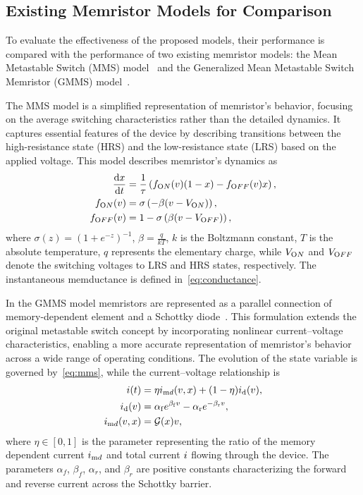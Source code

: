 \documentclass{ieeeaccess}
\begin{document}
\subsection{Existing Memristor Models for Comparison}

To evaluate the effectiveness of the proposed models, their performance is compared with the performance of two existing memristor models: the Mean Metastable Switch (MMS) model~\cite{Minati2020} and the  Generalized Mean Metastable Switch Memristor (GMMS) model~\cite{Molter2016, Ostrovskii2021}.

The MMS model is a simplified representation of memristor's behavior, focusing on the average switching characteristics rather than the detailed dynamics. It captures essential features of the device by describing transitions between the high-resistance state (HRS) and the low-resistance state (LRS) based on the applied voltage. This model describes memristor's dynamics as
\begin{align}
  \label{eq:mms}
  \frac{{\mathrm d} {x}}{{\mathrm d} t}       & = \frac{1}{\tau} \left( f_{\text ON} (v) (1-x) - f_{\text OFF} (v) x \right),              \\
  f_{\text ON} (v)  & = \sigma\left(-\beta (v-V_{\text ON})\right) \label{eq:mms5b},      \\
  f_{\text OFF} (v) & = 1 - \sigma\left(\beta (v-V_{\text OFF})\right)  \label{eq:mms5c}, 
\end{align}
where \(\sigma(z) = (1+e^{-z})^{-1}\), \(\beta= \frac{q}{kT}\), \(k\) is the Boltzmann constant, \(T\) is the absolute temperature, \(q\) represents the elementary charge, while \(V_{\text ON}\) and \(V_{\text OFF}\) denote the switching voltages to LRS and HRS states, respectively. The instantaneous memductance is defined in~\eqref{eq:conductance}.


In the GMMS model memristors are represented as a parallel connection of memory-dependent element and a Schottky diode~\cite{Molter2016, Ostrovskii2021}. This formulation extends the original metastable switch concept by incorporating nonlinear current--voltage characteristics, enabling a more accurate representation of memristor's behavior across a wide range of operating conditions.
The evolution of the state variable is governed by~\eqref{eq:mms}, while the current--voltage relationship is
\begin{align}
  \begin{split}
    i(t)     & = \eta i_{\mathrm md}(v, x) + (1-\eta) i_{\mathrm d}(v),                \\
    i_{\mathrm d}(v)     & = \alpha_{\mathrm f} e^{\beta_{\mathrm f} v} - \alpha_{\mathrm r} e^{-\beta_{\mathrm r} v}, \\
    i_{\mathrm md}(v, x) & = \mathcal{G}(x) v,
  \end{split}
  \label{eq:gmms}
\end{align}
where \(\eta\in [0,1]\) is the parameter representing the ratio of the memory dependent current \(i_{\mathrm md}\) and total current \(i\) flowing through the device. The parameters \(\alpha_f\), \(\beta_f\), \(\alpha_r\), and \(\beta_r\) are positive constants characterizing the forward and reverse current across the Schottky barrier.
\end{document}

